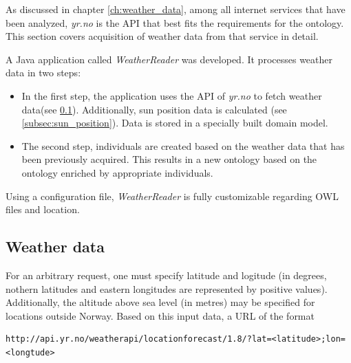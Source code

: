 As discussed in chapter \ref{ch:weather_data}, among all internet services that have been analyzed, \emph{yr.no} is the API that best fits the requirements for the \thinkhomeweather ontology. This section covers acquisition of weather data from that service in detail.

A Java application called \emph{WeatherReader} was developed. It processes weather data in two steps:

\begin{itemize}
  \item In the first step, the application uses the API of \emph{yr.no} to fetch weather data(see \ref{subsec:weather_data_yr_no}). Additionally, sun position data is calculated (see \ref{subsec:sun_position}). Data is stored in a specially built domain model. %
  \item The second step, individuals are created based on the weather data that has been previously acquired. This results in a new ontology based on the \thinkhomeweather ontology enriched by appropriate individuals.
\end{itemize}


Using a configuration file, \emph{WeatherReader} is fully customizable regarding OWL files and location.

\subsection{Weather data}
\label{subsec:weather_data_yr_no}

For an arbitrary request, one must specify latitude and logitude (in degrees, nothern latitudes and eastern longitudes are represented by positive values). Additionally, the altitude above sea level (in metres) may be specified for locations outside Norway. Based on this input data, a URL of the format

\begin{lstlisting}
http://api.yr.no/weatherapi/locationforecast/1.8/?lat=<latitude>;lon=<longtude>
\end{lstlisting}

